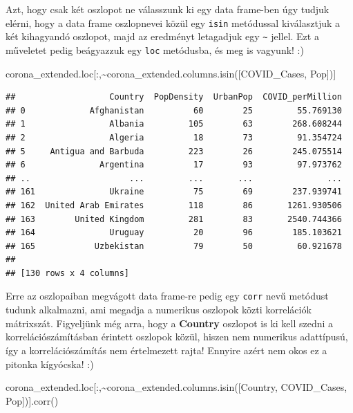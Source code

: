 \documentclass[
]{book}
\newenvironment{Shaded}{\begin{snugshade}}{\end{snugshade}}
\newcommand{\NormalTok}[1]{#1}
\newcommand{\OperatorTok}[1]{\textcolor[rgb]{0.81,0.36,0.00}{\textbf{#1}}}
\newcommand{\StringTok}[1]{\textcolor[rgb]{0.31,0.60,0.02}{#1}}
\begin{document}
Azt, hogy csak két oszlopot ne válasszunk ki egy data frame-ben úgy tudjuk elérni, hogy a data frame oszlopnevei közül egy \texttt{isin} metódussal kiválasztjuk a két kihagyandó oszlopot, majd az eredményt letagadjuk egy \texttt{\textasciitilde{}} jellel. Ezt a műveletet pedig beágyazzuk egy \texttt{loc} metódusba, és meg is vagyunk! :)

\begin{Shaded}
\begin{Highlighting}[]
\NormalTok{corona\_extended.loc[:,}\OperatorTok{\textasciitilde{}}\NormalTok{corona\_extended.columns.isin([}\StringTok{\textquotesingle{}COVID\_Cases\textquotesingle{}}\NormalTok{, }\StringTok{\textquotesingle{}Pop\textquotesingle{}}\NormalTok{])]}
\end{Highlighting}
\end{Shaded}

\begin{verbatim}
##                   Country  PopDensity  UrbanPop  COVID_perMillion
## 0             Afghanistan          60        25         55.769130
## 1                 Albania         105        63        268.608244
## 2                 Algeria          18        73         91.354724
## 5     Antigua and Barbuda         223        26        245.075514
## 6               Argentina          17        93         97.973762
## ..                    ...         ...       ...               ...
## 161               Ukraine          75        69        237.939741
## 162  United Arab Emirates         118        86       1261.930506
## 163        United Kingdom         281        83       2540.744366
## 164               Uruguay          20        96        185.103621
## 165            Uzbekistan          79        50         60.921678
## 
## [130 rows x 4 columns]
\end{verbatim}

Erre az oszlopaiban megvágott data frame-re pedig egy \texttt{corr} nevű metódust tudunk alkalmazni, ami megadja a numerikus oszlopok közti korrelációk mátrixszát. Figyeljünk még arra, hogy a \textbf{Country} oszlopot is ki kell szedni a korrelációszámításban érintett oszlopok közül, hiszen nem numerikus adattípusú, így a korrelációszámítás nem értelmezett rajta! Ennyire azért nem okos ez a pitonka kígyócska! :)

\begin{Shaded}
\begin{Highlighting}[]
\NormalTok{corona\_extended.loc[:,}\OperatorTok{\textasciitilde{}}\NormalTok{corona\_extended.columns.isin([}\StringTok{\textquotesingle{}Country\textquotesingle{}}\NormalTok{, }\StringTok{\textquotesingle{}COVID\_Cases\textquotesingle{}}\NormalTok{, }\StringTok{\textquotesingle{}Pop\textquotesingle{}}\NormalTok{])].corr()}
\end{Highlighting}
\end{Shaded}
\end{document}
